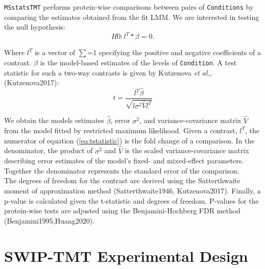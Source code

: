\documentclass[12pt]{elife}\usepackage[]{graphicx}\usepackage[]{color}
\begin{document}
\texttt{MSstatsTMT} performs protein-wise comparisons between pairs of 
\texttt{Conditions} by comparing the estimates obtained from the fit LMM. 
We are interested in testing the null hypothesis:\\

\begin{equation}
	\label{eq:null} %
	H0 : l^T * \beta = 0. 
\end{equation}

Where $l^T$ is a vector of $\sum$=1 specifying the positive and negative
coefficients of a contrast. $\beta$ is the model-based estimates of the 
levels of \texttt{Condition}. A test statistic for such a two-way contrasts is 
given by Kutzenova \textit{et al.,}(Kutzenova2017):\\

\begin{equation} 
	\label{eq:tstatistic} %
	t = \frac{l^T \hat{\beta}}{\sqrt{l \sigma^2 \hat{V} l^T}}
\end{equation}

We obtain the models estimates $\hat{\beta}$, error $\sigma^2$, and
variance-covariance matrix $\hat{V}$ from the model fitted by restricted maximum
likelihood. Given a contrast, $l^T$, the numerator of equation 
(\ref{eq:tstatistic}) is the fold change of a comparison. 
In the denominator, the product of $\sigma^2$ and $\hat{V}$ is the scaled 
variance-covariance matrix describing error estimates of the model's 
fixed- and mixed-effect parameters. Together the denominator 
represents the standard error of the comparison.\\

The degrees of freedom for the contrast are derived using the Satterthwaite
moment of approximation method (Satterthwaite1946, Kutzenova2017).  Finally,
a p-value is calculated given the t-statistic and degrees of freedom. 
P-values for the protein-wise tests are adjusted using the Benjamini-Hochberg 
FDR method (Benjamini1995,Huang2020).\\

\section{SWIP-TMT Experimental Design}
\end{document}

